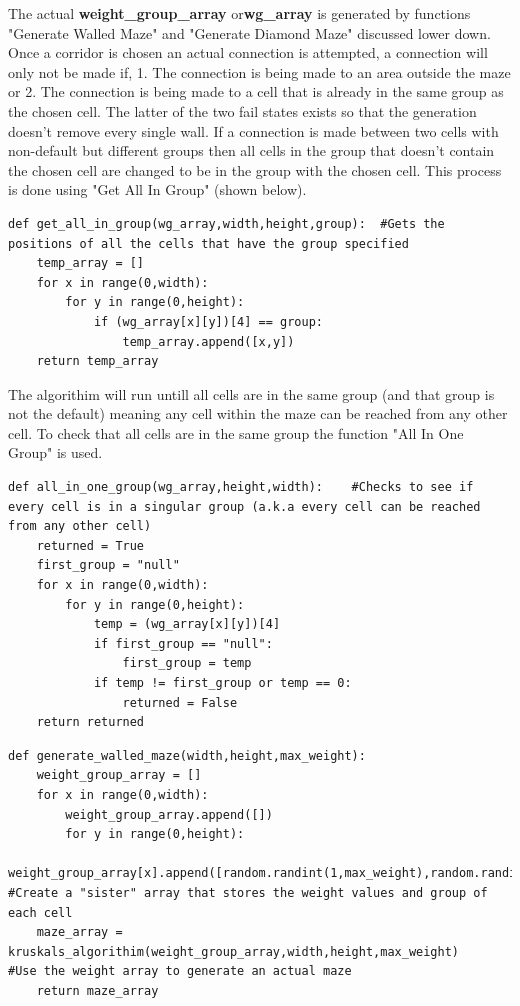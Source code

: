 The actual \textbf{weight\_group\_array} or\textbf{wg\_array}  is generated by functions "Generate Walled Maze" and "Generate Diamond Maze" discussed lower down.
Once a corridor is chosen an actual connection is attempted, a connection will only not be made if, 1. The connection is being made to an area outside the maze or 2. The
connection is being made to a cell that is already in the same group as the chosen cell. The latter of the two fail states exists so that the generation doesn't remove every single wall.
If a connection is made between two cells with non-default but different groups then all cells in the group that doesn't contain the chosen cell are changed to be in the group
with the chosen cell. This process is done using "Get All In Group" (shown below).
\begin{lstlisting}
def get_all_in_group(wg_array,width,height,group):  #Gets the positions of all the cells that have the group specified
    temp_array = []
    for x in range(0,width):
        for y in range(0,height):
            if (wg_array[x][y])[4] == group:
                temp_array.append([x,y])
    return temp_array
\end{lstlisting}
The algorithim will run untill all cells are in the same group (and that group is not the default) meaning any cell within the maze can be reached from any other cell. To check
that all cells are in the same group the function "All In One Group" is used.
\begin{lstlisting}
def all_in_one_group(wg_array,height,width):    #Checks to see if every cell is in a singular group (a.k.a every cell can be reached from any other cell)
    returned = True
    first_group = "null"
    for x in range(0,width):
        for y in range(0,height):
            temp = (wg_array[x][y])[4]
            if first_group == "null":
                first_group = temp
            if temp != first_group or temp == 0:
                returned = False                
    return returned
\end{lstlisting}
\begin{lstlisting}
def generate_walled_maze(width,height,max_weight):
    weight_group_array = []                 
    for x in range(0,width):
        weight_group_array.append([])
        for y in range(0,height):
            weight_group_array[x].append([random.randint(1,max_weight),random.randint(1,max_weight),random.randint(1,max_weight),random.randint(1,max_weight),0])   #Create a "sister" array that stores the weight values and group of each cell
    maze_array = kruskals_algorithim(weight_group_array,width,height,max_weight)    #Use the weight array to generate an actual maze
    return maze_array
\end{lstlisting}
